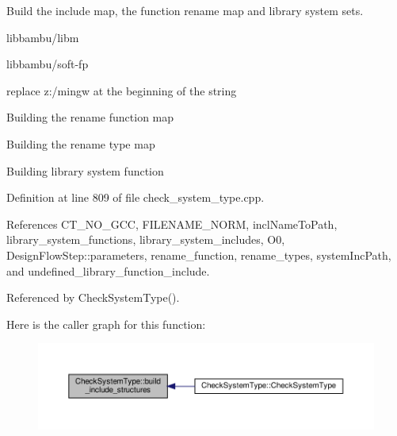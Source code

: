 Build the include map, the function rename map and library system sets. 

libbambu/libm

libbambu/soft-\/fp

replace z\+:/mingw at the beginning of the string

Building the rename function map

Building the rename type map

Building library system function 

Definition at line 809 of file check\+\_\+system\+\_\+type.\+cpp.



References C\+T\+\_\+\+N\+O\+\_\+\+G\+CC, F\+I\+L\+E\+N\+A\+M\+E\+\_\+\+N\+O\+RM, incl\+Name\+To\+Path, library\+\_\+system\+\_\+functions, library\+\_\+system\+\_\+includes, O0, Design\+Flow\+Step\+::parameters, rename\+\_\+function, rename\+\_\+types, system\+Inc\+Path, and undefined\+\_\+library\+\_\+function\+\_\+include.



Referenced by Check\+System\+Type().

Here is the caller graph for this function\+:
\nopagebreak
\begin{figure}[H]
\begin{center}
\leavevmode
\includegraphics[width=350pt]{d9/df6/classCheckSystemType_aec96886624b0bbe586f38f8bcf7cdca0_icgraph}
\end{center}
\end{figure}
\mbox{\label{classCheckSystemType_a0b50a94579fcc308bbf1177fe2827cc5}} 
